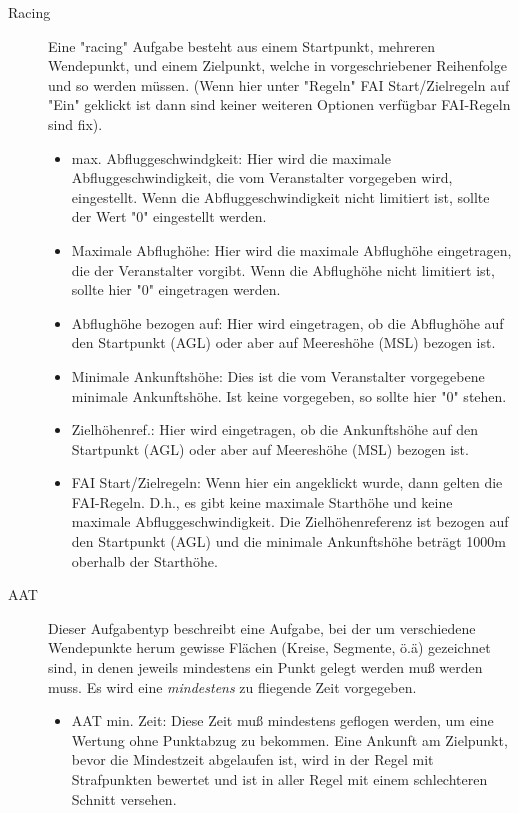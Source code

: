 \begin{description}
\item[Racing] Eine  "racing" Aufgabe besteht aus einem Startpunkt, mehreren Wendepunkt,  und einem Zielpunkt, welche in vorgeschriebener Reihenfolge und so werden müssen. (Wenn hier unter "Regeln" FAI Start/Zielregeln auf "Ein" geklickt ist dann sind keiner weiteren Optionen verfügbar FAI-Regeln sind fix).
        \begin{itemize}
            \item max. Abfluggeschwindgkeit:     Hier wird die maximale Abfluggeschwindigkeit, die vom Veranstalter vorgegeben wird, eingestellt. Wenn die Abfluggeschwindigkeit nicht limitiert ist, sollte der Wert "0"  eingestellt werden.
            \item Maximale Abflughöhe: Hier wird die maximale Abflughöhe eingetragen, die der Veranstalter vorgibt.   Wenn die Abflughöhe nicht limitiert ist, sollte hier "0" eingetragen werden.
            \item Abflughöhe bezogen auf: Hier wird eingetragen, ob die Abflughöhe auf den Startpunkt (AGL) oder aber auf  Meereshöhe (MSL) bezogen ist.
            \item Minimale Ankunftshöhe:  Dies ist die vom Veranstalter vorgegebene minimale Ankunftshöhe. Ist keine vorgegeben, so sollte hier "0"  stehen.
            \item Zielhöhenref.:  Hier wird eingetragen, ob die Ankunftshöhe auf den  Startpunkt (AGL) oder aber auf  Meereshöhe (MSL) bezogen ist.
            \item FAI Start/Zielregeln: Wenn hier ein angeklickt wurde,  dann  gelten die FAI-Regeln. D.h., es gibt keine maximale Starthöhe und keine maximale Abfluggeschwindigkeit. Die Zielhöhenreferenz ist bezogen auf den Startpunkt (AGL) und die minimale Ankunftshöhe beträgt 1000m oberhalb der Starthöhe. 
    \end{itemize}
\item[AAT]
 Dieser Aufgabentyp beschreibt eine  Aufgabe, bei der um verschiedene Wendepunkte herum gewisse Flächen (Kreise, Segmente, ö.ä) gezeichnet sind, in denen jeweils mindestens ein Punkt gelegt werden muß werden muss.
 Es wird eine \textsl{mindestens} zu fliegende Zeit vorgegeben.
    \begin{itemize}
            \item AAT min. Zeit:  Diese Zeit muß mindestens geflogen werden, um eine Wertung ohne Punktabzug zu bekommen. Eine Ankunft am Zielpunkt, bevor die Mindestzeit abgelaufen ist, wird in der Regel mit Strafpunkten bewertet und ist in aller Regel mit einem schlechteren Schnitt versehen.

\end{itemize}
\end{description}
